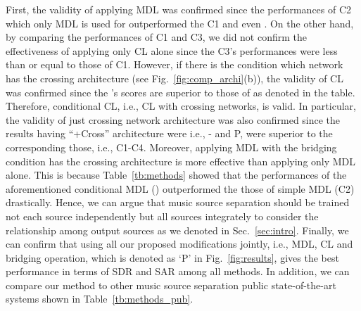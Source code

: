 \documentclass{article}
\begin{document}
First, the validity of applying MDL was confirmed since the performances of C2 which only MDL is used for outperformed the C1 and even .
On the other hand, by comparing the performances of C1 and C3, we did not confirm the effectiveness of applying only CL alone since the C3's performances were less than or equal to those of C1.
However, if there is the condition which network has the crossing architecture (see Fig.~\ref{fig:comp_archi}(b)), the validity of CL was confirmed since the 's scores are superior to those of  as denoted in the table.
Therefore, conditional CL, i.e., CL with crossing networks, is valid.
In particular, the validity of just crossing network architecture was also confirmed since the results having ``+Cross'' architecture were i.e., - and P, were superior to the corresponding those, i.e., C1-C4.
Moreover, applying MDL with the bridging condition has the crossing architecture is more effective than applying only MDL alone.
This is because Table~\ref{tb:methods} showed that the performances of the aforementioned conditional MDL () outperformed the those of simple MDL (C2) drastically.
Hence, we can argue that music source separation should be trained not each source independently but all sources integrately to consider the relationship among output sources as we denoted in Sec.~\ref{sec:intro}.
\fi
Finally, we can confirm that using all our proposed modifications jointly, i.e., MDL, CL and bridging operation, which is denoted as `P' in Fig.~\ref{fig:results}, gives the best performance in terms of SDR and SAR among all methods.
In addition, we can compare our method to other music source separation public state-of-the-art systems shown in Table~\ref{tb:methods_pub}.
\\
\end{document}
